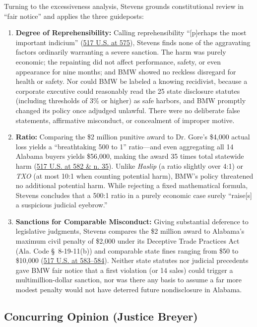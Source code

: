 \documentclass[12pt]{article}
\begin{document}
Turning to the excessiveness analysis, Stevens grounds constitutional review in ``fair notice'' and applies the three guideposts:
\begin{enumerate}
\item \textbf{Degree of Reprehensibility:} Calling reprehensibility ``[p]erhaps the most important indicium'' (\href{https://supreme.justia.com/cases/federal/us/517/559/}{517 U.S. at 575}), Stevens finds none of the aggravating factors ordinarily warranting a severe sanction. The harm was purely economic; the repainting did not affect performance, safety, or even appearance for nine months; and BMW showed no reckless disregard for health or safety. Nor could BMW be labeled a knowing recidivist, because a corporate executive could reasonably read the 25 state disclosure statutes (including thresholds of 3\% or higher) as safe harbors, and BMW promptly changed its policy once adjudged unlawful. There were no deliberate false statements, affirmative misconduct, or concealment of improper motive.
\item \textbf{Ratio:} Comparing the \$2 million punitive award to Dr. Gore's \$4,000 actual loss yields a ``breathtaking 500 to 1'' ratio---and even aggregating all 14 Alabama buyers yields \$56,000, making the award 35 times total statewide harm (\href{https://supreme.justia.com/cases/federal/us/517/559/}{517 U.S. at 582 \& n. 35}). Unlike \textit{Haslip} (a ratio slightly over 4:1) or \textit{TXO} (at most 10:1 when counting potential harm), BMW's policy threatened no additional potential harm. While rejecting a fixed mathematical formula, Stevens concludes that a 500:1 ratio in a purely economic case surely ``raise[s] a suspicious judicial eyebrow.''
\item \textbf{Sanctions for Comparable Misconduct:} Giving substantial deference to legislative judgments, Stevens compares the \$2 million award to Alabama's maximum civil penalty of \$2,000 under its Deceptive Trade Practices Act (Ala. Code \S~8-19-11(b)) and comparable state fines ranging from \$50 to \$10,000 (\href{https://supreme.justia.com/cases/federal/us/517/559/}{517 U.S. at 583--584}). Neither state statutes nor judicial precedents gave BMW fair notice that a first violation (or 14 sales) could trigger a multimillion-dollar sanction, nor was there any basis to assume a far more modest penalty would not have deterred future nondisclosure in Alabama.
\end{enumerate}

\subsection{Concurring Opinion (Justice Breyer)}
\end{document}
